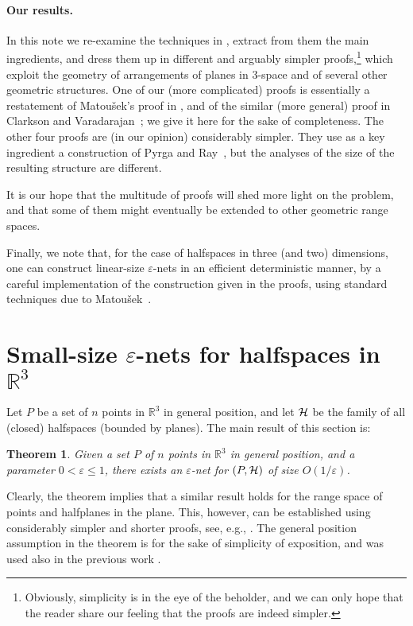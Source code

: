 \documentclass[12pt]{article}
\newtheorem{theorem}{Theorem}[section]
\newcommand{\eps}{{\varepsilon}}
\newcommand{\reals}{{\mathbb R}}
\providecommand{\Matousek}{Matou{\v s}ek\xspace}
\newcommand{\CalH}{{\cal H}}
\begin{document}
\paragraph{Our results.}
In this note we re-examine the techniques in 
\cite{ cv-iaags-07, m-rph-92, pr-nepen-08}, extract from them the main 
ingredients, and dress them up in different and arguably simpler proofs,\footnote{Obviously, simplicity is in the eye of the beholder, and we can
   only hope that the reader share our feeling that the proofs are
   indeed simpler.}  
which exploit the geometry of arrangements of planes in 3-space 
and of several other geometric structures. One of
our (more complicated) proofs is essentially a restatement of
\Matousek's proof in \cite{m-rph-92}, and of the similar (more
general) proof in Clarkson and Varadarajan~\cite{cv-iaags-07}; 
we give it here for the sake of
completeness. The other four proofs are (in our opinion) considerably
simpler. They use as a key ingredient a construction of Pyrga and
Ray~\cite{pr-nepen-08}, but the analyses of the size of the resulting
structure are different.

It is our hope that the multitude
of proofs will shed more light on the problem, and that some of them
might eventually be extended to other geometric range spaces.



Finally, we note that, for the case of halfspaces in three (and two)
dimensions, one can construct linear-size $\eps$-nets in an efficient
deterministic manner, by a careful implementation of the construction
given in the proofs, using standard techniques due to
\Matousek~\cite{m-dcg-96}.



\section{Small-size $\eps$-nets for halfspaces in $\reals^3$}

Let $P$ be a set of $n$ points in $\reals^3$ in general position, and
let $\CalH$ be the family of all (closed) halfspaces (bounded by
planes).  The main result of this section is:
\begin{theorem}\label{main3d}Given a set $P$ of $n$ points in $\reals^3$ in general position,
    and a parameter $0<\eps\le 1$, there exists an $\eps$-net for
    $(P,\CalH)$ of size $O(1/\eps)$.
\end{theorem}


Clearly, the theorem implies that a similar result holds for the range
space of points and halfplanes in the plane. This, however, can be
established using considerably simpler and shorter proofs, see, e.g.,
\cite{sy-pchp-12, w-enh-89}. The general position assumption in
the theorem is for the sake of simplicity of exposition, and was used
also in the previous work \cite{msw-hnlls-90}.
\end{document}
